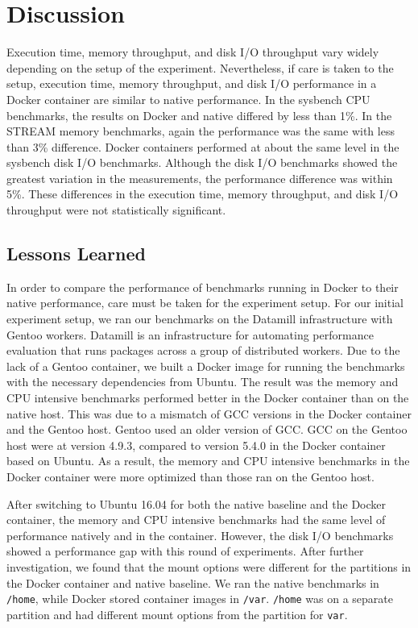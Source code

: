 \documentclass[11pt]{article}
\begin{document}
	\section{Discussion}
	Execution time, memory throughput, and disk I/O throughput vary widely depending on the setup of the experiment. Nevertheless, if care is taken to the setup, execution time, memory throughput, and disk I/O performance in a Docker container are similar to native performance. In the sysbench CPU benchmarks, the results on Docker and native differed by less than 1\%. In the STREAM memory benchmarks, again the performance was the same with less than 3\% difference. Docker containers performed at about the same level in the sysbench disk I/O benchmarks. Although the disk I/O benchmarks showed the greatest variation in the measurements, the performance difference was within 5\%. These differences in the execution time, memory throughput, and disk I/O throughput were not statistically significant. 
	
	
	\subsection{Lessons Learned}
	In order to compare the performance of benchmarks running in Docker to their native performance, care must be taken for the experiment setup. For our initial experiment setup, we ran our benchmarks on the Datamill infrastructure with Gentoo workers. Datamill is an infrastructure for automating performance evaluation that runs packages across a group of distributed workers. Due to the lack of a Gentoo container, we built a Docker image for running the benchmarks with the necessary dependencies from Ubuntu. The result was the memory and CPU intensive benchmarks performed better in the Docker container than on the native host. This was due to a mismatch of GCC versions in the Docker container and the Gentoo host. Gentoo used an older version of GCC. GCC on the Gentoo host were at version 4.9.3, compared to version 5.4.0 in the Docker container based on Ubuntu. As a result, the memory and CPU intensive benchmarks in the Docker container were more optimized than those ran on the Gentoo host. 
	
	After switching to Ubuntu 16.04 for both the native baseline and the Docker container, the memory and  CPU intensive benchmarks had the same level of performance natively and in the container. However, the disk I/O benchmarks showed a performance gap with this round of experiments. After further investigation, we found that the mount options were different for the partitions in the Docker container and native baseline. We ran the native benchmarks in \texttt{/home}, while Docker stored container images in \texttt{/var}. \texttt{/home} was on a separate partition and had different mount options from the partition for \texttt{var}. 
	
\end{document}
